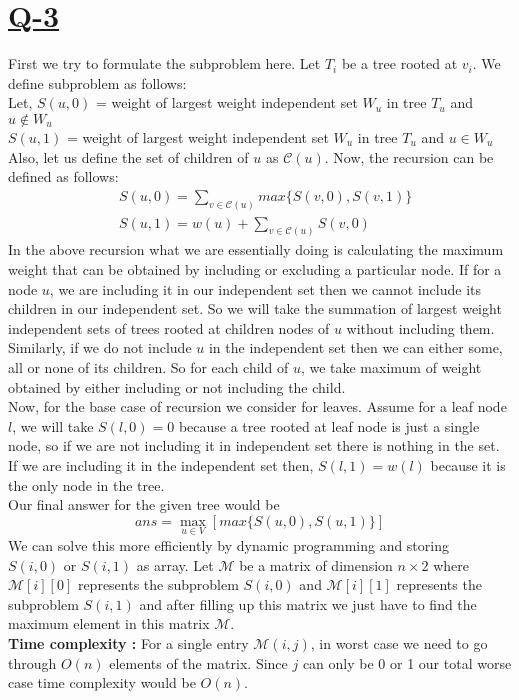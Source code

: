 \documentclass[14pt]{article}
\begin{document}
	\section*{\underline{Q-3}}
		\noindent
		First we try to formulate the subproblem here. Let $T_i$ be a tree rooted at $v_i$. We define subproblem as follows:\\
		Let, $S(u, 0)$ = weight of largest weight independent set $W_u$ in tree $T_u$ and $u \notin W_u$\\
		$S(u, 1)$ = weight of largest weight independent set $W_u$ in tree $T_u$ and $u \in W_u$\\
		Also, let us define the set of children of $u$ as $\mathcal{C}(u)$. Now, the recursion can be defined as follows:\\
		\begin{align*}
			&S(u, 0) = \sum_{v \in \mathcal{C}(u)} max\{S(v, 0), S(v, 1)\}\\
			&S(u, 1) = w(u) + \sum_{v \in \mathcal{C}(u)} S(v, 0)
		\end{align*}
		In the above recursion what we are essentially doing is calculating the maximum weight that can be obtained by including or excluding a particular node. If for a node $u$, we are including it in our independent set then we cannot include its children in our independent set. So we will take the summation of largest weight independent sets of trees rooted at children nodes of $u$ without including them. Similarly, if we do not include $u$ in the independent set then we can either some, all or none of its children. So for each child of $u$, we take maximum of weight obtained by either including or not including the child. \\
		\newline
		Now, for the base case of recursion we consider for leaves. Assume for a leaf node $l$, we will take $S(l, 0) = 0$ because a tree rooted at leaf node is just a single node, so if we are not including it in independent set there is nothing in the set. If we are including it in the independent set then, $S(l, 1) = w(l)$ because it is the only node in the tree.\\
		\newline
		Our final answer for the given tree would be $$ ans = \max_{u \in V}[max\{S(u, 0), S(u, 1)\}]$$ 
		We can solve this more efficiently by dynamic programming and storing $S(i, 0) \text{ or } S(i, 1)$ as array. Let $\mathcal{M}$ be a matrix of dimension $n \times 2$ where $\mathcal{M}[i][0]$ represents the subproblem $S(i, 0)$ and $\mathcal{M}[i][1]$ represents the subproblem $S(i, 1)$ and after filling up this matrix we just have to find the maximum element in this matrix $\mathcal{M}$.\\
		\newline
		\textbf{Time complexity : }For a single entry $\mathcal{M}(i, j)$, in worst case we need to go through $O(n)$ elements of the matrix. Since $j$ can only be 0 or 1 our total worse case time complexity would be $O(n)$.\\
		\newline
	
\end{document}
